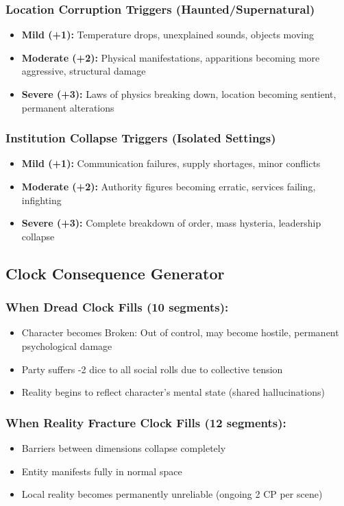 \documentclass[11pt]{article}
\begin{document}
\subsubsection{Location Corruption Triggers (Haunted/Supernatural)}
\begin{itemize}
\item \textbf{Mild (+1):} Temperature drops, unexplained sounds, objects moving
\item \textbf{Moderate (+2):} Physical manifestations, apparitions becoming more aggressive, structural damage
\item \textbf{Severe (+3):} Laws of physics breaking down, location becoming sentient, permanent alterations
\end{itemize}

\subsubsection{Institution Collapse Triggers (Isolated Settings)}
\begin{itemize}
\item \textbf{Mild (+1):} Communication failures, supply shortages, minor conflicts
\item \textbf{Moderate (+2):} Authority figures becoming erratic, services failing, infighting
\item \textbf{Severe (+3):} Complete breakdown of order, mass hysteria, leadership collapse
\end{itemize}

\subsection{Clock Consequence Generator}

\subsubsection{When Dread Clock Fills (10 segments):}
\begin{itemize}
\item Character becomes Broken: Out of control, may become hostile, permanent psychological damage
\item Party suffers -2 dice to all social rolls due to collective tension
\item Reality begins to reflect character's mental state (shared hallucinations)
\end{itemize}

\subsubsection{When Reality Fracture Clock Fills (12 segments):}
\begin{itemize}
\item Barriers between dimensions collapse completely
\item Entity manifests fully in normal space
\item Local reality becomes permanently unreliable (ongoing 2 CP per scene)
\end{itemize}
\end{document}
